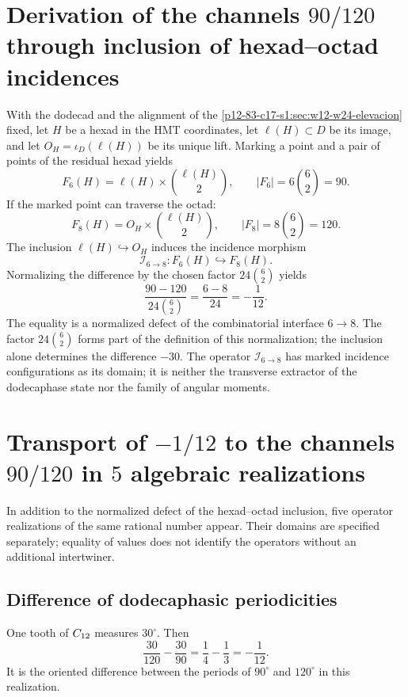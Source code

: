 \label{chap:83-14}

\section{Derivation of the channels \(90/120\) through inclusion of hexad--octad incidences}

With the dodecad and the alignment of the
\cref{p12-83-c17-s1:sec:w12-w24-elevacion} fixed, let \(H\) be a hexad in the HMT coordinates,
let \(\ell(H)\subset D\) be its image, and let
\(O_H=\iota_D(\ell(H))\) be its unique lift. Marking a point
and a pair of points of the residual hexad yields
\[
F_6(H)=\ell(H)\times\binom{\ell(H)}2,
\qquad
|F_6|=6\binom62=90.
\]
If the marked point can traverse the octad:
\[
F_8(H)=O_H\times\binom{\ell(H)}2,
\qquad
|F_8|=8\binom62=120.
\]
The inclusion \(\ell(H)\hookrightarrow O_H\) induces the incidence morphism
\[
 \mathcal I_{6\to8}:F_6(H)\hookrightarrow F_8(H).
\]
Normalizing the difference by the chosen
factor \(24\binom62\) yields
\[
\boxed{
\frac{90-120}{24\binom62}
=\frac{6-8}{24}
=-\frac1{12}.}
\]
The equality is a normalized defect of the combinatorial interface \(6\to8\). The factor \(24\binom62\) forms part of the definition of this normalization; the inclusion alone determines the difference \(-30\). The operator \(\mathcal I_{6\to8}\) has marked incidence configurations as its domain; it is neither the transverse extractor of the dodecaphase state nor the family of angular moments.

\section{Transport of \(-1/12\) to the channels \(90/120\) in \(5\) algebraic realizations}

In addition to the normalized defect of the hexad--octad inclusion,
five operator realizations of the same rational number appear. Their domains are
specified separately; equality of values does not identify the
operators without an additional intertwiner.

\subsection{Difference of dodecaphasic periodicities}

One tooth of \(C_{12}\) measures \(30^\circ\). Then
\[
\frac{30}{120}-\frac{30}{90}
=\frac14-\frac13
=-\frac1{12}.
\]
It is the oriented difference between the periods of \(90^\circ\) and
\(120^\circ\) in this realization.

